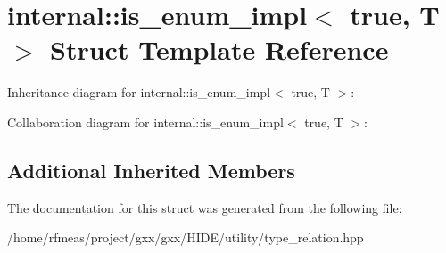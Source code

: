 \hypertarget{structinternal_1_1is__enum__impl_3_01true_00_01T_01_4}{}\section{internal\+:\+:is\+\_\+enum\+\_\+impl$<$ true, T $>$ Struct Template Reference}
\label{structinternal_1_1is__enum__impl_3_01true_00_01T_01_4}


Inheritance diagram for internal\+:\+:is\+\_\+enum\+\_\+impl$<$ true, T $>$\+:


Collaboration diagram for internal\+:\+:is\+\_\+enum\+\_\+impl$<$ true, T $>$\+:
\subsection*{Additional Inherited Members}


The documentation for this struct was generated from the following file\+:\begin{DoxyCompactItemize}
\item 
/home/rfmeas/project/gxx/gxx/\+H\+I\+D\+E/utility/type\+\_\+relation.\+hpp\end{DoxyCompactItemize}
